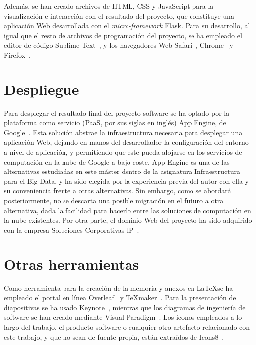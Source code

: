 Además, se han creado archivos de HTML, CSS y JavaScript para la visualización e interacción con el resultado del proyecto, que constituye una aplicación Web desarrollada con el \textit{micro-framework} Flask. Para su desarrollo, al igual que el resto de archivos de programación del proyecto, se ha empleado el editor de código Sublime Text~\cite{sublime}, y los navegadores Web Safari~\cite{safari}, Chrome~\cite{chrome} y Firefox~\cite{firefox}.

\section{Despliegue}

Para desplegar el resultado final del proyecto software se ha optado por la plataforma como servicio (PaaS, por sus siglas en inglés) App Engine, de Google~\cite{appengine}. Esta solución abstrae la infraestructura necesaria para desplegar una aplicación Web, dejando en manos del desarrollador la configuración del entorno a nivel de aplicación, y permitiendo que este pueda alojarse en los servicios de computación en la nube de Google a bajo coste. App Engine es una de las alternativas estudiadas en este máster dentro de la asignatura \guillemotleft Infraestructura para el Big Data\guillemotright, y ha sido elegida por la experiencia previa del autor con ella y su conveniencia frente a otras alternativas. Sin embargo, como se abordará posteriormente, no se descarta una posible migración en el futuro a otra alternativa, dada la facilidad para hacerlo entre las soluciones de computación en la nube existentes. Por otra parte, el dominio Web del proyecto ha sido adquirido con la empresa Soluciones Corporativas IP~\cite{dondominio}.

\section{Otras herramientas}

Como herramienta para la creación de la memoria y anexos en \LaTeX \space se ha empleado el portal en línea Overleaf~\cite{overleaf} y \TeX{}maker~\cite{texmaker}. Para la presentación de diapositivas se ha usado Keynote~\cite{keynote}, mientras que los diagramas de ingeniería de software se han creado mediante Visual Paradigm~\cite{visual_paradigm}. Los iconos empleados a lo largo del trabajo, el producto software o cualquier otro artefacto relacionado con este trabajo, y que no sean de fuente propia, están extraídos de Icons8~\cite{icons8}.
